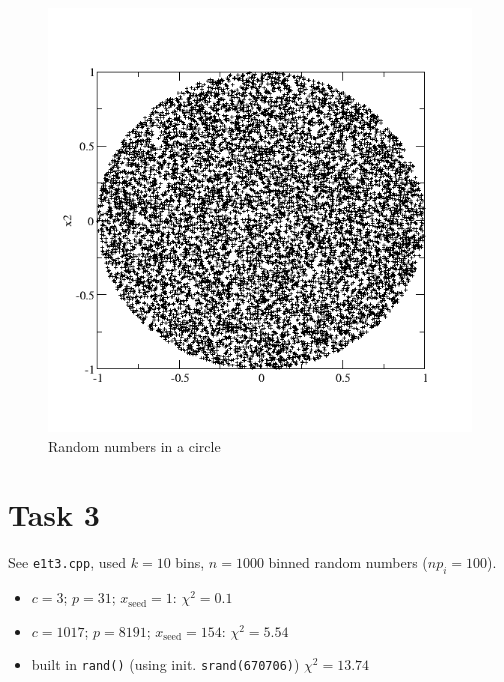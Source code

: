 \begin{figure}[b]
  \centering
  \includegraphics[width=\textwidth]{../pic/e1t2.png}
  \caption{Random numbers in a circle}
  \label{fig:e1t2}
\end{figure}


\section{Task 3}
See \verb|e1t3.cpp|, used $k=10$ bins, $n=1000$ binned random numbers ($np_i=100$).
\begin{itemize}
  \item $c = 3$; $p = 31$; $x_\mathrm{seed} = 1$: $\chi^2 = 0.1$
  \item $c = 1017$; $p = 8191$; $x_\mathrm{seed} = 154$: $\chi^2 = 5.54$
  \item built in \verb|rand()| (using init. \verb|srand(670706)|) $\chi^2 = 13.74$
\end{itemize}